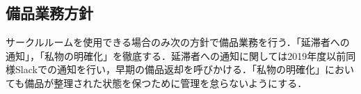 \subsection*{備品業務方針}

サークルルームを使用できる場合のみ次の方針で備品業務を行う．「延滞者への通知」，「私物の明確化」を徹底する．延滞者への通知に関しては2019年度以前同様Slackでの通知を行い，早期の備品返却を呼びかける．「私物の明確化」においても備品が整理された状態を保つために管理を怠らないようにする．
